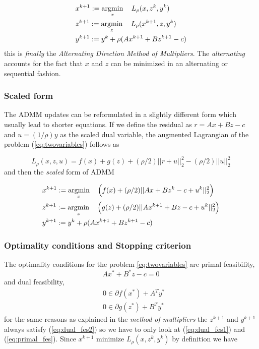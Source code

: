 \begin{align}
&x^{k+1} := \operatorname*{argmin}_x \quad L_\rho(x,z^k,y^k)\\
&z^{k+1} := \operatorname*{argmin}_z \quad L_\rho(x^{k+1},z,y^k)\\
&y^{k+1} := y^k + \rho(Ax^{k+1}+Bz^{k+1} -c)
\end{align}
this is \textit{finally} the \textit{Alternating Direction Method of Multipliers}. The \textit{alternating} accounts for the fact that $x$ and $z$ can be minimized in an alternating or sequential fashion. 

\subsubsection{Scaled form}

The ADMM updates can be reformulated in a slightly different form which usually lead to shorter equations. If we define the residual as $r=Ax+Bz-c$ and $u = (1/\rho)y$ as the scaled dual variable, the augmented Lagrangian of the problem (\ref{eq:twovariables}) follows as

\begin{equation*}
	L_\rho(x,z,u) = f(x) + g(z) + (\rho/2)||r+u||_2^2 - (\rho/2)||u||_2^2
\end{equation*}
and then the \textit{scaled} form of ADMM 

\begin{align}
&x^{k+1} := \operatorname*{argmin}_x \quad \Big(f(x)+(\rho/2)||Ax+Bz^k-c+u^k||_2^2\Big)\\
&z^{k+1} := \operatorname*{argmin}_z \quad \Big(g(z)+(\rho/2)||Ax^{k+1}+Bz-c+u^k||_2^2\Big)\\
&y^{k+1} := y^k + \rho(Ax^{k+1}+Bz^{k+1} -c)
\end{align}

\subsubsection{Optimality conditions and Stopping criterion}
The optimality conditions for the problem \ref{eq:twovariables} are primal feasibility,
\begin{equation}
	Ax^* + B^*z -c = 0 \label{eq:primal_fes}
\end{equation}
and dual feasibility,
\begin{align}
	&0\in \partial f(x^*)+A^Ty^*\label{eq:dual_fes1}\\
	&0\in \partial g(z^*)+B^Ty^* \label{eq:dual_fes2}
\end{align}
for the same reasons as explained in the \textit{method of multipliers} the $z^{k+1}$ and $y^{k+1}$ always satisfy (\ref{eq:dual_fes2}) so we have to only look at (\ref{eq:dual_fes1}) and (\ref{eq:primal_fes}). Since $x^{k+1}$ minimize $L_\rho(x,z^k,y^k)$ by definition we have

